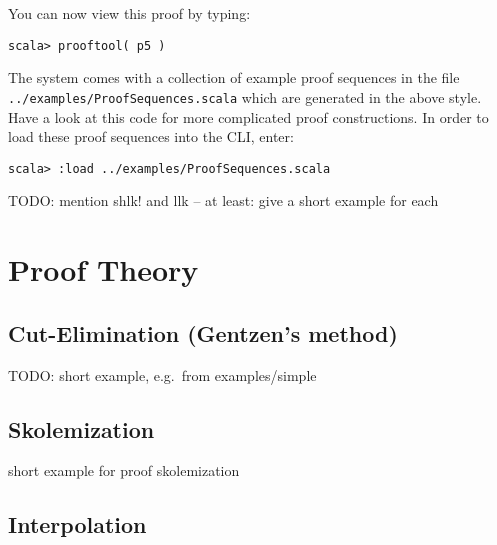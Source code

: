 \documentclass[a4paper,11pt]{article}
\newcommand{\cli}[1]{{\tt {#1}}}
\newenvironment{meta}{\color{red}}{\color{black}}
\begin{document}
%
You can now view this proof by typing:
\begin{lstlisting}
scala> prooftool( p5 )
\end{lstlisting}

The system comes with a collection of example proof sequences in the file
\cli{../examples/ProofSequences.scala} which are generated in the above style.
Have a look at this code for more complicated proof constructions. In order
to load these proof sequences into the CLI, enter:
\begin{lstlisting}
scala> :load ../examples/ProofSequences.scala
\end{lstlisting}

\begin{meta}
TODO: mention shlk! and llk -- at least: give a short example for each
\end{meta}


\section{Proof Theory}

\subsection{Cut-Elimination (Gentzen's method)}

\begin{meta}
TODO: short example, e.g.~from examples/simple 
\end{meta}


\subsection{Skolemization}

\begin{meta}
short example for proof skolemization 
\end{meta}


\subsection{Interpolation}
\end{document}
